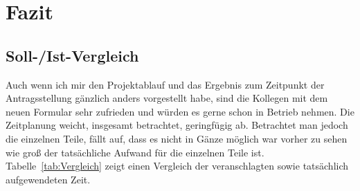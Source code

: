 \section{Fazit} 
\label{sec:Fazit}

\subsection{Soll-/Ist-Vergleich}
\label{sec:SollIstVergleich}
Auch wenn ich mir den Projektablauf und das Ergebnis zum Zeitpunkt der Antragsstellung gänzlich anders vorgestellt habe, sind die Kollegen mit dem neuen Formular sehr zufrieden und würden es gerne schon in Betrieb nehmen. Die Zeitplanung weicht, insgesamt betrachtet, geringfügig ab. Betrachtet man jedoch die einzelnen Teile, fällt auf, dass es nicht in Gänze möglich war vorher zu sehen wie groß der tatsächliche Aufwand für die einzelnen Teile ist. Tabelle~\ref{tab:Vergleich} zeigt einen Vergleich der veranschlagten sowie tatsächlich aufgewendeten Zeit.


